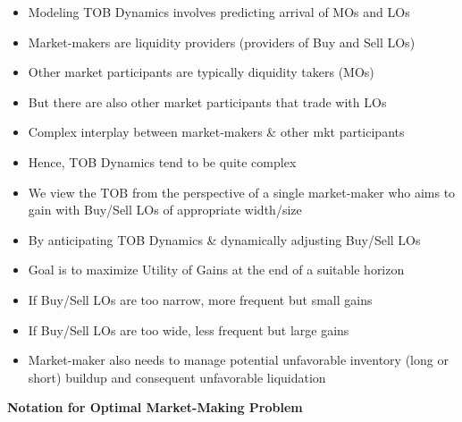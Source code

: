 \documentclass[10pt]{article}
\begin{document}
\begin{itemize} 
    \item Modeling TOB Dynamics involves predicting arrival of MOs and LOs
    \item Market-makers are liquidity providers (providers of Buy and Sell LOs)
    \item Other market participants are typically diquidity takers (MOs)
    \item But there are also other market participants that trade with LOs
    \item Complex interplay between market-makers \& other mkt participants
    \item Hence, TOB Dynamics tend to be quite complex
    \item We view the $\mathrm{TOB}$ from the perspective of a single market-maker who aims to gain with Buy/Sell LOs of appropriate width/size
    \item By anticipating TOB Dynamics \& dynamically adjusting Buy/Sell LOs
    \item Goal is to maximize Utility of Gains at the end of a suitable horizon
    \item If Buy/Sell LOs are too narrow, more frequent but small gains
    \item If Buy/Sell LOs are too wide, less frequent but large gains
    \item Market-maker also needs to manage potential unfavorable inventory (long or short) buildup and consequent unfavorable liquidation
\end{itemize}

\textbf{Notation for Optimal Market-Making Problem}
\end{document}

